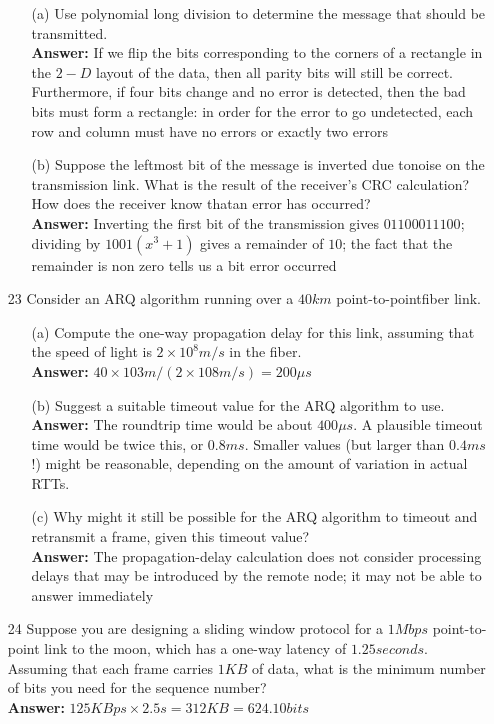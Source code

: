 \documentclass[a4paper]{article}
\begin{document}
\begin{itemize}
\begin{itemize}
	      	\item[(a)] Use polynomial long division to determine the message that should be transmitted. \\
	      	      \textbf{Answer:} If we flip the bits corresponding to the corners of a rectangle in the $2-D$ layout of the data, then all parity bits will still be correct. Furthermore, if four bits change and no error is detected, then the bad bits must form a rectangle: in order for the error to go undetected, each row and column must have no errors or exactly two errors 
	      	\item[(b)] Suppose the leftmost bit of the message is inverted due tonoise on the transmission link. What is the result of the receiver’s CRC calculation? How does the receiver know thatan error has occurred? \\
	      	      \textbf{Answer:} Inverting the first bit of the transmission gives $0110 0011 100$; dividing by $1001 (x^3 + 1)$ gives a remainder of $10$; the fact that the remainder is non zero tells us a bit error occurred 
	      \end{itemize} 
	\item[23] Consider an ARQ algorithm running over a $40 km$ point-to-pointfiber link.
	      \begin{itemize}
	      	\item[(a)] Compute the one-way propagation delay for this link, assuming that the speed of light is $2 \times 10^8m/s$ in the fiber. \\
	      	      \textbf{Answer:} $40 \times 103 m/(2 \times 108 m/s) = 200 \mu s$ 
	      	\item[(b)] Suggest a suitable timeout value for the ARQ algorithm to use. \\
	      	      \textbf{Answer:} The roundtrip time would be about $400 \mu s$. A plausible timeout time would be twice this, or $0.8ms$. Smaller values (but larger than $0.4ms$!) might be reasonable, depending on the amount of variation in actual RTTs.
	      	\item[(c)] Why might it still be possible for the ARQ algorithm to timeout and retransmit a frame, given this timeout value? \\
	      	      \textbf{Answer:} The propagation-delay calculation does not consider processing delays that may be introduced by the remote node; it may not be able to answer immediately 
	      \end{itemize}
	\item[24] Suppose you are designing a sliding window protocol for a $1 Mbps$ point-to-point link to the moon, which has a one-way latency of $1.25 seconds$. Assuming that each frame carries $1 KB$ of data, what is the minimum number of bits you need for the sequence number? \\
	      \textbf{Answer:} $125KBps \times 2.5s = 312 KB = 624. 10 bits$
\end{itemize}
\end{document}
